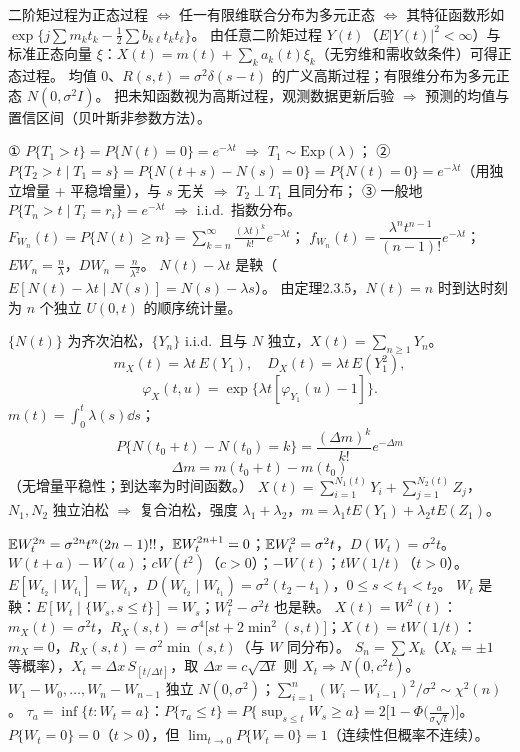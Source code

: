 \documentclass[UTF8,12pt,a4paper]{ctexart}
\begin{document}
 二阶矩过程为正态过程 $\iff$ 任一有限维联合分布为多元正态 $\iff$ 其特征函数形如 $\exp\{j\sum m_kt_k-\frac12\sum b_{k\ell}t_kt_\ell\}$。
 由任意二阶矩过程 $Y(t)$（$E|Y(t)|^2<\infty$）与标准正态向量 $\xi$：$X(t)=m(t)+\sum_k a_k(t)\xi_k$（无穷维和需收敛条件）可得正态过程。
 均值 0、$R(s,t)=\sigma^2\delta(s-t)$ 的广义高斯过程；有限维分布为多元正态 $N(0,\sigma^2I)$。
 把未知函数视为高斯过程，观测数据更新后验 $\Rightarrow$ 预测的均值与置信区间（贝叶斯非参数方法）。

 ① $P\{T_1>t\}=P\{N(t)=0\}=e^{-\lambda t}$ $\Rightarrow$ $T_1\sim\mathrm{Exp}(\lambda)$；
② $P\{T_2>t\mid T_1=s\}=P\{N(t+s)-N(s)=0\}=P\{N(t)=0\}=e^{-\lambda t}$（用独立增量 + 平稳增量），与 $s$ 无关 $\Rightarrow$ $T_2\perp T_1$ 且同分布；
③ 一般地 $P\{T_n>t\mid T_i=r_i\}=e^{-\lambda t}$ $\Rightarrow$ i.i.d.\ 指数分布。
 $F_{W_n}(t)=P\{N(t)\ge n\}=\sum_{k=n}^{\infty}\frac{(\lambda t)^k}{k!}e^{-\lambda t}$；
$f_{W_n}(t)=\dfrac{\lambda^nt^{n-1}}{(n-1)!}e^{-\lambda t}$；$E W_n=\frac n\lambda$，$D W_n=\frac n{\lambda^2}$。
 $N(t)-\lambda t$ 是鞅（$E[N(t)-\lambda t\mid N(s)]=N(s)-\lambda s$）。
 由定理2.3.5，$N(t)=n$ 时到达时刻为 $n$ 个独立 $U(0,t)$ 的顺序统计量。

 $\{N(t)\}$ 为齐次泊松，$\{Y_n\}$ i.i.d.\ 且与 $N$ 独立，$X(t)=\sum_{n\ge1}Y_n$。
$$m_X(t)=\lambda t\,E(Y_1),\quad D_X(t)=\lambda t\,E(Y_1^2),$$
$$\varphi_X(t,u)=\exp\{\lambda t[\varphi_{Y_1}(u)-1]\}.$$
 $m(t)=\int_0^t\lambda(s)\dd s$；
$$P\{N(t_0+t)-N(t_0)=k\}=\frac{(\Delta m)^k}{k!}e^{-\Delta m}$$
$$\Delta m=m(t_0+t)-m(t_0)$$
（无增量平稳性；到达率为时间函数。）
 $X(t)=\sum_{i=1}^{N_1(t)}Y_i+\sum_{j=1}^{N_2(t)}Z_j$，$N_1,N_2$ 独立泊松 $\Rightarrow$ 复合泊松，强度 $\lambda_1+\lambda_2$，$m=\lambda_1tE(Y_1)+\lambda_2tE(Z_1)$。

 $\mathbb{E} W_t^{2n}=\sigma^{2n}t^n(2n-1)!!$，$\mathbb{E} W_t^{2n+1}=0$；$\mathbb{E} W_t^2=\sigma^2t$，$D(W_t)=\sigma^2t$。
 $W(t+a)-W(a)$；$cW(t^2)$（$c>0$）；$-W(t)$；$tW(1/t)$（$t>0$）。
 $E[W_{t_2}\mid W_{t_1}]=W_{t_1}$，$D(W_{t_2}\mid W_{t_1})=\sigma^2(t_2-t_1)$，$0\le s<t_1<t_2$。
 $W_t$ 是鞅：$E[W_t\mid\{W_s,s\le t\}]=W_s$；$W_t^2-\sigma^2t$ 也是鞅。
 $X(t)=W^2(t)$：$m_X(t)=\sigma^2t$，$R_X(s,t)=\sigma^4\big[st+2\min^2(s,t)\big]$；$X(t)=tW(1/t)$：$m_X=0$，$R_X(s,t)=\sigma^2\min(s,t)$（与 $W$ 同分布）。
 $S_n=\sum X_k$（$X_k=\pm1$ 等概率），$X_t=\Delta x\,S_{[t/\Delta t]}$，取 $\Delta x=c\sqrt{\Delta t}$ 则 $X_t\Rightarrow N(0,c^2t)$。
 $W_1-W_0,\dots,W_n-W_{n-1}$ 独立 $N(0,\sigma^2)$；$\sum_{i=1}^n(W_i-W_{i-1})^2/\sigma^2\sim\chi^2(n)$。
 $\tau_a=\inf\{t:W_t=a\}$：$P\{\tau_a\le t\}=P\{\sup_{s\le t}W_s\ge a\}=2\big[1-\Phi\big(\tfrac{a}{\sigma\sqrt t}\big)\big]$。
 $P\{W_t=0\}=0$（$t>0$），但 $\lim_{t\to0}P\{W_t=0\}=1$（连续性但概率不连续）。
\end{document}
